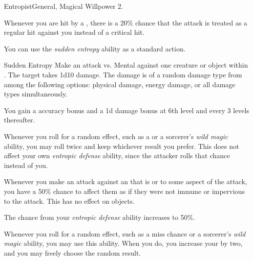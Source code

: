     \begin{feat}{Entropist}{General, Magical}
        \featpre Willpower 2.

         Whenever you are hit by a , there is a 20\% chance that the attack is treated as a regular hit against you instead of a critical hit.

         You can use the \textit{sudden entropy} ability as a standard action.
        \begin{activeability}{Sudden Entropy}
            \rankline
            Make an attack vs. Mental against one creature or object within \medrange.
            \hit The target takes 1d10 \add {} damage.
            The damage is of a random damage type from among the following options: physical damage, energy damage, or all damage types simultaneously.

            \rankline
            You gain a  accuracy bonus and a \plus1d damage bonus at 6th level and every 3 levels thereafter.
        \end{activeability}

         Whenever you roll for a random effect, such as a  or a sorcerer's \textit{wild magic} ability, you may roll twice and keep whichever result you prefer.
        This does not affect your own \textit{entropic defense} ability, since the attacker rolls that chance instead of you.

         Whenever you make an attack against an  that is  or  to some aspect of the attack, you have a 50\% chance to affect them as if they were not immune or impervious to the attack.
        This has no effect on objects.

         The chance from your \textit{entropic defense} ability increases to 50\%.

         Whenever you roll for a random effect, such as a miss chance or a sorcerer's \textit{wild magic} ability, you may use this ability.
        When you do, you increase your  by two, and you may freely choose the random result.
    \end{feat}


